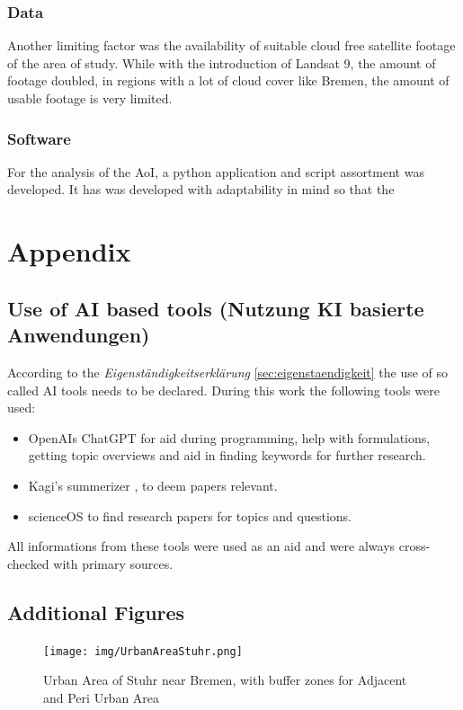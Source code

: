 \documentclass[12pt,a4paper, english,twoside]{scrartcl}
\begin{document}
\subsubsection{Data}
Another limiting factor was the availability of suitable cloud free satellite footage of the area of study.
While with the introduction of Landsat 9, the amount of footage doubled, in regions with a lot of cloud cover like Bremen, the amount of usable footage is very limited.

\subsubsection{Software}
For the analysis of the \gls{AoI}, a python application and script assortment was developed. 
It has was developed with adaptability in mind so that the 

\newpage
\section{Appendix}
  \subsection{Use of AI based tools (Nutzung KI basierte Anwendungen)}
  According to the \textit{Eigenständigkeitserklärung} \cref{sec:eigenstaendigkeit} the use of so called AI tools needs to be declared. 
    During this work the following tools were used: 
  \begin{itemize}
    \item OpenAIs ChatGPT \autocite{chatgpt} for aid during programming, help with formulations, getting topic overviews and aid in finding keywords for further research.
    \item Kagi's summerizer \autocite{kagi}, to deem papers relevant.
    \item scienceOS \autocite{scienceos} to find research papers for topics and questions. 
    \end{itemize}
    All informations from these tools were used as an aid and were always cross-checked with primary sources. 
  \subsection{Additional Figures}
    \begin{figure}[!htbp]
        \texttt{[image: img/UrbanAreaStuhr.png]}
        \caption{Urban Area of Stuhr near Bremen, with buffer zones for Adjacent and Peri Urban Area\label{fig:appxStuhr}}
    \end{figure}
\end{document}
